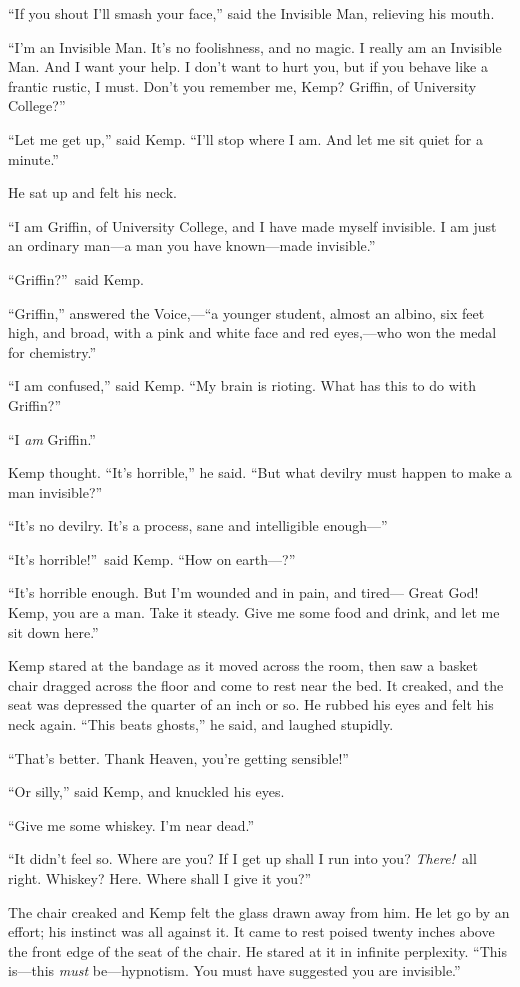 “If you shout I’ll smash your face,” said the Invisible Man, relieving his mouth.

“I’m an Invisible Man. It’s no foolishness, and no magic. I really am an Invisible Man. And I want your help. I don’t want to hurt you, but if you behave like a frantic rustic, I must. Don’t you remember me, Kemp? Griffin, of University College?”

“Let me get up,” said Kemp. “I’ll stop where I am. And let me sit quiet for a minute.”

He sat up and felt his neck.

“I am Griffin, of University College, and I have made myself invisible. I am just an ordinary man—a man you have known—made invisible.”

“Griffin?”\ said Kemp.

“Griffin,” answered the Voice,—“a younger student, almost an albino, six feet high, and broad, with a pink and white face and red eyes,—who won the medal for chemistry.”

“I am confused,” said Kemp. “My brain is rioting. What has this to do with Griffin?”

“I \emph{am} Griffin.”

Kemp thought. “It’s horrible,” he said. “But what devilry must happen to make a man invisible?”

“It’s no devilry. It’s a process, sane and intelligible enough—”

“It’s horrible!”\ said Kemp. “How on earth—?”

“It’s horrible enough. But I’m wounded and in pain, and tired— Great God! Kemp, you are a man. Take it steady. Give me some food and drink, and let me sit down here.”

Kemp stared at the bandage as it moved across the room, then saw a basket chair dragged across the floor and come to rest near the bed. It creaked, and the seat was depressed the quarter of an inch or so. He rubbed his eyes and felt his neck again. “This beats ghosts,” he said, and laughed stupidly.

“That’s better. Thank Heaven, you’re getting sensible!”

“Or silly,” said Kemp, and knuckled his eyes.

“Give me some whiskey. I’m near dead.”

“It didn’t feel so. Where are you? If I get up shall I run into you? \emph{There!}\ all right. Whiskey? Here. Where shall I give it you?”

The chair creaked and Kemp felt the glass drawn away from him. He let go by an effort; his instinct was all against it. It came to rest poised twenty inches above the front edge of the seat of the chair. He stared at it in infinite perplexity. “This is—this \emph{must} be—hypnotism. You must have suggested you are invisible.”

